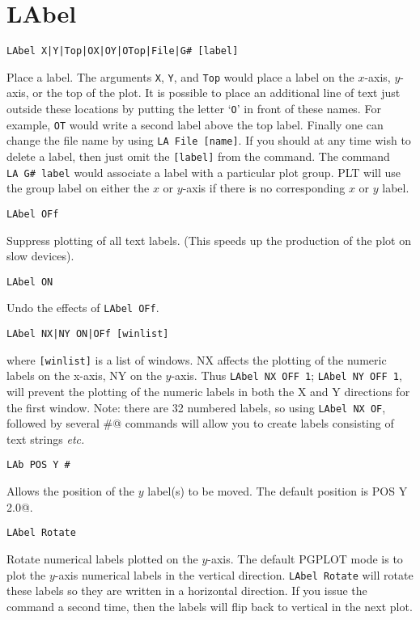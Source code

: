 \section*{LAbel}
\begin{verbatim}
LAbel X|Y|Top|OX|OY|OTop|File|G# [label]
\end{verbatim}
   Place a label.  The arguments {\tt X}, {\tt Y}, and {\tt Top} would place a
label on the $x$-axis, $y$-axis, or the top of the plot.  It is possible
to place an additional line of text just outside these locations by
putting the letter `{\tt O}' in front of these names.  For example, {\tt OT}
would write a second label above the top label.  Finally one can change
the file name by using {\tt LA~File~[name]}. If you should at any time
wish to delete a label, then just omit the {\tt [label]} from the command.
The command {\tt LA~G\#~label} would associate a label with a particular
plot group.  PLT will use the group label on either the $x$ or $y$-axis
if there is no corresponding $x$ or $y$ label.

\medskip
\begin{verbatim}
LAbel OFf
\end{verbatim}
   Suppress plotting of all text labels.  (This speeds up the production
of the plot on slow devices).

\medskip
\begin{verbatim}
LAbel ON
\end{verbatim}
   Undo the effects of {\tt LAbel~OFf}.

\medskip
\begin{verbatim}
LAbel NX|NY ON|OFf [winlist]
\end{verbatim}
   where {\tt [winlist]} is a list of windows.  NX affects the plotting of the
numeric labels on the x-axis, NY on the $y$-axis.  Thus {\tt LAbel~NX~OFF~1};
{\tt LAbel~NY~OFF~1}, will prevent the plotting of the numeric labels in both
the X and Y directions for the first window.  Note: there are 32 numbered
labels, so using {\tt LAbel~NX~OF}, followed by several \verb@LAbel #@ commands will
allow you to create labels consisting of text strings {\it etc.}

\medskip
\begin{verbatim}
LAb POS Y #
\end{verbatim}
   Allows the position of the $y$ label(s) to be moved.  The default
position is \verb@LA POS Y 2.0@.

\medskip
\begin{verbatim}
LAbel Rotate
\end{verbatim}
   Rotate numerical labels plotted on the $y$-axis.  The default PGPLOT
mode is to plot the $y$-axis numerical labels in the vertical direction.
{\tt LAbel~Rotate} will rotate these labels so they are written in a
horizontal direction.  If you issue the command a second time, then
the labels will flip back to vertical in the next plot.

